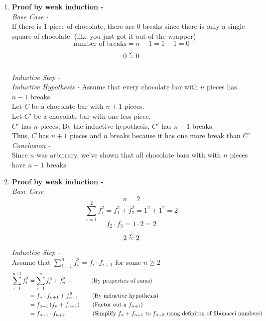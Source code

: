 \documentclass[9pt]{article}
\begin{document}
        \begin{enumerate}
            \item \textbf{Proof by weak induction -} \\
            \textit{Base Case -} \\ 
            If there is 1 piece of chocolate, there are 0 breaks since there is only a single square of chocolate. (like you just got it out of the wrapper)\\
            
            $$\text{number of breaks} = n-1 = 1-1 = 0$$
            $$0 \stackrel{\text{\checkmark}}{=} 0 $$\\

            \textit{Inductive Step -} \\
            \textit{Inductive Hypothesis -}
            Assume that every chocolate bar with $n$ pieces has $n-1$ breaks. \\
            Let $C$ be a chocolate bar with $n+1$ pieces.\\
            Let $C'$ be a chocolate bar with one less piece.\\
            $C'$ has $n$ pieces, By the inductive hypothesis, $C'$ has $n-1$ breaks.\\
            Thus, $C$ has $n+1$ pieces and $n$ breaks because it has one more break than $C'$
            \\

            \textit{Conclusion -} \\
            Since $n$ was arbitrary, we've shown that all chocolate bars with with $n$ pieces have $n-1$ breaks
            
            \item \textbf{Proof by weak induction -} \\
            \textit{Base Case -}\\ $$n = 2$$ 
            $$\sum_{i=1}^{2} f_i^2 = f_1^2 + f_2^2 = 1^2  + 1^2 = 2$$
            $$f_{2} \cdot f_{3} = 1 \cdot 2 = 2$$
            $$2 \stackrel{\text{\checkmark}}{=} 2 $$ 

            \textit{Inductive Step -} \\
            Assume that $\sum_{i=1}^{n} f_i^2 = f_{i} \cdot f_{i+1}$ for some $n \geq 2$\\
            \begin{equation*}
                \begin{split}
                    \sum_{i=1}^{n+1} f_i^2 & = \sum_{i=1}^{n} f_i^2 + f_{n+1}^2\text{~~~~\quad \quad (By properties of sums)}\\
                    & = f_n \cdot f_{n+1} + f_{n+1}^2\text{~\quad \quad (By inductive hypothesis)}\\
                    & = f_{n+1} \left(f_n+ f_{n+1}\right)\text{\quad \quad (Factor out a }f_{n+1}\text{)}\\
                    & = f_{n+1} \cdot f_{n+2} \text{\quad\quad\quad~~\quad (Simplify }f_n + f_{n+1}\text{ to } f_{n+2} \text{ using definiton of fibonacci numbers)}
                \end{split} 
            \end{equation*}


\end{enumerate}
\end{document}
